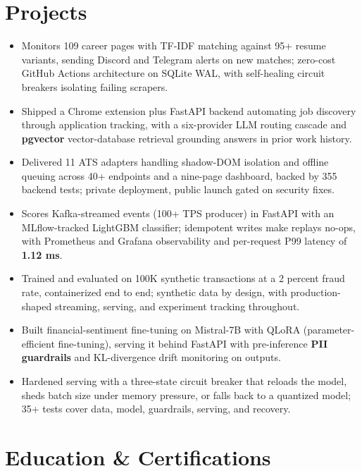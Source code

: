 \documentclass[letterpaper,10pt]{article}
\begin{document}
\section{Projects}
\begin{itemize}
\item Monitors 109 career pages with TF-IDF matching against 95+ resume variants, sending Discord and Telegram alerts on new matches; zero-cost GitHub Actions architecture on SQLite WAL, with self-healing circuit breakers isolating failing scrapers.
\end{itemize}
\begin{itemize}
\item Shipped a Chrome extension plus FastAPI backend automating job discovery through application tracking, with a six-provider LLM routing cascade and \textbf{pgvector} vector-database retrieval grounding answers in prior work history.
\item Delivered 11 ATS adapters handling shadow-DOM isolation and offline queuing across 40+ endpoints and a nine-page dashboard, backed by 355 backend tests; private deployment, public launch gated on security fixes.
\end{itemize}
\begin{itemize}
\item Scores Kafka-streamed events (100+ TPS producer) in FastAPI with an MLflow-tracked LightGBM classifier; idempotent writes make replays no-ops, with Prometheus and Grafana observability and per-request P99 latency of \textbf{1.12 ms}.
\item Trained and evaluated on 100K synthetic transactions at a 2 percent fraud rate, containerized end to end; synthetic data by design, with production-shaped streaming, serving, and experiment tracking throughout.
\end{itemize}
\begin{itemize}
\item Built financial-sentiment fine-tuning on Mistral-7B with QLoRA (parameter-efficient fine-tuning), serving it behind FastAPI with pre-inference \textbf{PII guardrails} and KL-divergence drift monitoring on outputs.
\item Hardened serving with a three-state circuit breaker that reloads the model, sheds batch size under memory pressure, or falls back to a quantized model; 35+ tests cover data, model, guardrails, serving, and recovery.
\end{itemize}

\section{Education \& Certifications}
\end{document}

